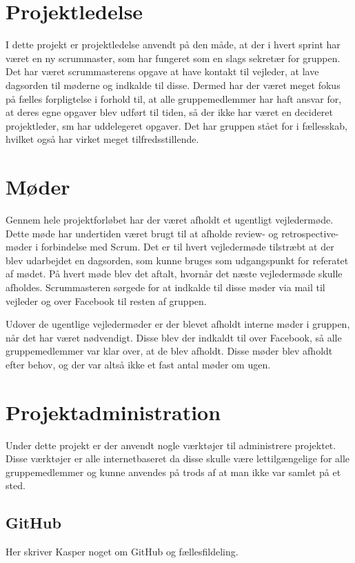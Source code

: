 \section{Projektledelse}
I dette projekt er projektledelse anvendt på den måde, at der i hvert sprint har været en ny scrummaster, som har fungeret som en slags sekretær for gruppen. Det har været scrummasterens opgave at have kontakt til vejleder, at lave dagsorden til møderne og indkalde til disse. Dermed har der været meget fokus på fælles forpligtelse i forhold til, at alle gruppemedlemmer har haft ansvar for, at deres egne opgaver blev udført til tiden, så der ikke har været en decideret projektleder, sm har uddelegeret opgaver. Det har gruppen stået for i fællesskab, hvilket også har virket meget tilfredsstillende. 

\section{Møder}
Gennem hele projektforløbet har der været afholdt et ugentligt vejledermøde. Dette møde har undertiden været brugt til at afholde review- og retrospective-møder i forbindelse med Scrum. Det er til hvert vejledermøde tilstræbt at der blev udarbejdet en dagsorden, som kunne bruges som udgangspunkt for referatet af mødet. På hvert møde blev det aftalt, hvornår det næste vejledermøde skulle afholdes. Scrummasteren sørgede for at indkalde til disse møder via mail til vejleder og over Facebook til resten af gruppen. 

Udover de ugentlige vejledermøder er der blevet afholdt interne møder i gruppen, når det har været nødvendigt. Disse blev der indkaldt til over Facebook, så alle gruppemedlemmer var klar over, at de blev afholdt. Disse møder blev afholdt efter behov, og der var altså ikke et fast antal møder om ugen. 

\section{Projektadministration}
Under dette projekt er der anvendt nogle værktøjer til administrere projektet. Disse værktøjer er alle internetbaseret da disse skulle være lettilgængelige for alle gruppemedlemmer og kunne anvendes på trods af at man ikke var samlet på et sted.

\subsection{GitHub}
Her skriver Kasper noget om GitHub og fællesfildeling. 

